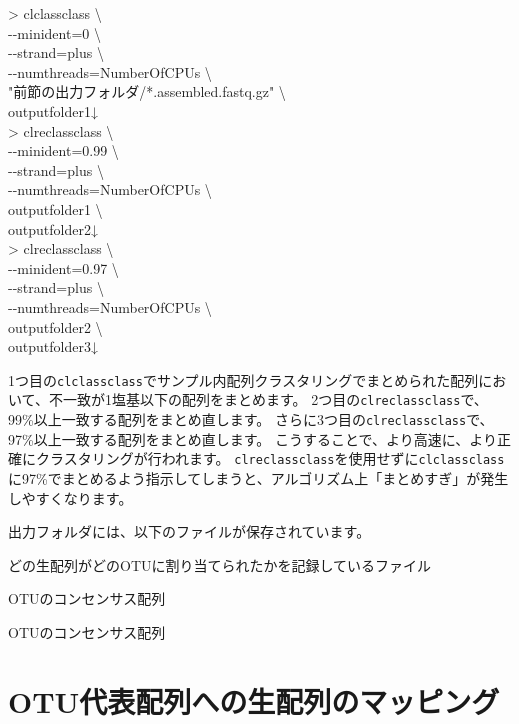 \documentclass[titlepage,10pt,a4paper,english]{jsbook}
\newenvironment{cmd}{\begin{oframed}\raggedright\ttfamily\footnotesize\setlength{\baselineskip}{1.4em}}{\end{oframed}\vspace{-1em}}
\begin{document}
\begin{cmd}
{\textgreater} clclassclass {\textbackslash}\\
{-}{-}minident=0 {\textbackslash}\\
{-}{-}strand=plus {\textbackslash}\\
{-}{-}numthreads=NumberOfCPUs {\textbackslash}\\
"前節の出力フォルダ/*.assembled.fastq.gz" {\textbackslash}\\
outputfolder1↓\\
{\textgreater} clreclassclass {\textbackslash}\\
{-}{-}minident=0.99 {\textbackslash}\\
{-}{-}strand=plus {\textbackslash}\\
{-}{-}numthreads=NumberOfCPUs {\textbackslash}\\
outputfolder1 {\textbackslash}\\
outputfolder2↓\\
{\textgreater} clreclassclass {\textbackslash}\\
{-}{-}minident=0.97 {\textbackslash}\\
{-}{-}strand=plus {\textbackslash}\\
{-}{-}numthreads=NumberOfCPUs {\textbackslash}\\
outputfolder2 {\textbackslash}\\
outputfolder3↓
\end{cmd}
1つ目の\texttt{clclassclass}でサンプル内配列クラスタリングでまとめられた配列において、不一致が1塩基以下の配列をまとめます。
2つ目の\texttt{clreclassclass}で、99\%以上一致する配列をまとめ直します。
さらに3つ目の\texttt{clreclassclass}で、97\%以上一致する配列をまとめ直します。
こうすることで、より高速に、より正確にクラスタリングが行われます。
\texttt{clreclassclass}を使用せずに\texttt{clclassclass}に97\%でまとめるよう指示してしまうと、アルゴリズム上「まとめすぎ」が発生しやすくなります。

出力フォルダには、以下のファイルが保存されています。
\begin{description}\small\setlength{\baselineskip}{1.1em}
\item[assembled.contigmembers.gz] どの生配列がどのOTUに割り当てられたかを記録しているファイル
\item[assembled.fastq.gz] OTUのコンセンサス配列
\item[assembled.fasta] OTUのコンセンサス配列
\end{description}

\section{OTU代表配列への生配列のマッピング}
\end{document}
